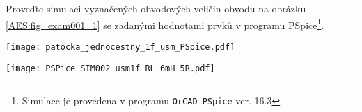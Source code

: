 \begin{example}\label{AES:exam001}
  Proveďte simulaci vyznačených obvodových veličin obvodu na obrá\-zku \ref{AES:fig_exam001_1} se 
  zadanými hodnotami prvků v programu  PSpice\footnote{Simulace je provedena v programu 
  \texttt{OrCAD PSpice} ver. 16.3}.

   {\centering
    \captionsetup{type=figure} 
    \texttt{[image: patocka\_jednocestny\_1f\_usm\_PSpice.pdf]}
    \label{AES:fig_exam001_1}
    \par}

   {\centering
    \captionsetup{type=figure} 
    \texttt{[image: PSPice\_SIM002\_usm1f\_RL\_6mH\_5R.pdf]}
    \label{AES:fig_exam001_2}
    \par}
\end{example}